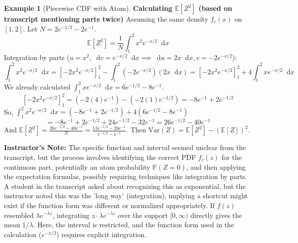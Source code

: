 \documentclass[11pt, letterpaper]{article}
\theoremstyle{plain} %
\theoremstyle{definition} %
\newtheorem{example}[theorem]{Example}
\theoremstyle{remark} %
\newenvironment{instructorcomment}
  {\par\medskip\noindent\begin{framed}\textbf{Instructor's Note:} \normalfont}
  {\end{framed}\medskip}
\newcommand{\E}{\mathbb{E}}
\newcommand{\Var}{\mathrm{Var}}
\newcommand{\Prob}{\mathbb{P}}
\newcommand{\dee}{\mathop{}\!\mathrm{d}} %
\begin{document}
\begin{example}[Piecewise CDF with Atom]
\textbf{Calculating $\E[Z^2]$ (based on transcript mentioning parts twice)}
Assuming the same density $f_c(x)$ on $[1, 2]$. Let $N=2e^{-1/2}-2e^{-1}$.
\[ \E[Z^2] = \frac{1}{N} \int_1^2 x^2 e^{-x/2} \dee x \]
Integration by parts ($u=x^2, \dee v = e^{-x/2} \dee x \implies \dee u = 2x \dee x, v = -2e^{-x/2}$):
\[ \int_1^2 x^2 e^{-x/2} \dee x = [-2x^2e^{-x/2}]_1^2 - \int_1^2 (-2e^{-x/2})(2x \dee x) = [-2x^2e^{-x/2}]_1^2 + 4 \int_1^2 x e^{-x/2} \dee x \]
We already calculated $\int_1^2 x e^{-x/2} \dee x = 6e^{-1/2} - 8e^{-1}$.
\[ [-2x^2e^{-x/2}]_1^2 = (-2(4)e^{-1}) - (-2(1)e^{-1/2}) = -8e^{-1} + 2e^{-1/2} \]
So, $\int_1^2 x^2 e^{-x/2} \dee x = (-8e^{-1} + 2e^{-1/2}) + 4 (6e^{-1/2} - 8e^{-1})$
\[ = -8e^{-1} + 2e^{-1/2} + 24e^{-1/2} - 32e^{-1} = 26e^{-1/2} - 40e^{-1} \]
And $\E[Z^2] = \frac{26e^{-1/2} - 40e^{-1}}{N} = \frac{13e^{-1/2} - 20e^{-1}}{e^{-1/2}-e^{-1}}$.
Then $\Var(Z) = \E[Z^2] - (\E[Z])^2$.

\begin{instructorcomment}
The specific function and interval seemed unclear from the transcript, but the process involves identifying the correct PDF $f_c(z)$ for the continuous part, potentially an atom probability $\Prob(Z=0)$, and then applying the expectation formulas, possibly requiring techniques like integration by parts. A student in the transcript asked about recognizing this as exponential, but the instructor noted this was the 'long way' (integration), implying a shortcut might exist if the function form was different or normalized appropriately. If $f(z)$ resembled $\lambda e^{-\lambda z}$, integrating $z \cdot \lambda e^{-\lambda z}$ over the support $[0, \infty)$ directly gives the mean $1/\lambda$. Here, the interval is restricted, and the function form used in the calculation ($e^{-x/2}$) requires explicit integration.
\end{instructorcomment}
\end{example}
\end{document}
